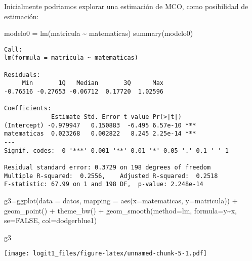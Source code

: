 \documentclass[
]{article}
\newenvironment{Shaded}{\begin{snugshade}}{\end{snugshade}}
\newcommand{\AttributeTok}[1]{\textcolor[rgb]{0.77,0.63,0.00}{#1}}
\newcommand{\ConstantTok}[1]{\textcolor[rgb]{0.00,0.00,0.00}{#1}}
\newcommand{\FunctionTok}[1]{\textcolor[rgb]{0.00,0.00,0.00}{#1}}
\newcommand{\NormalTok}[1]{#1}
\newcommand{\OtherTok}[1]{\textcolor[rgb]{0.56,0.35,0.01}{#1}}
\newcommand{\SpecialCharTok}[1]{\textcolor[rgb]{0.00,0.00,0.00}{#1}}
\newcommand{\StringTok}[1]{\textcolor[rgb]{0.31,0.60,0.02}{#1}}
\begin{document}
Inicialmente podriamos explorar una estimación de MCO, como posibilidad
de estimación:

\begin{Shaded}
\begin{Highlighting}[]
\NormalTok{modelo0 }\OtherTok{=} \FunctionTok{lm}\NormalTok{(matricula }\SpecialCharTok{\textasciitilde{}}\NormalTok{ matematicas)}
\FunctionTok{summary}\NormalTok{(modelo0)}
\end{Highlighting}
\end{Shaded}

\begin{verbatim}
Call:
lm(formula = matricula ~ matematicas)

Residuals:
     Min       1Q   Median       3Q      Max 
-0.76516 -0.27653 -0.06712  0.17720  1.02596 

Coefficients:
             Estimate Std. Error t value Pr(>|t|)    
(Intercept) -0.979947   0.150883  -6.495 6.57e-10 ***
matematicas  0.023268   0.002822   8.245 2.25e-14 ***
---
Signif. codes:  0 '***' 0.001 '**' 0.01 '*' 0.05 '.' 0.1 ' ' 1

Residual standard error: 0.3729 on 198 degrees of freedom
Multiple R-squared:  0.2556,    Adjusted R-squared:  0.2518 
F-statistic: 67.99 on 1 and 198 DF,  p-value: 2.248e-14
\end{verbatim}

\begin{Shaded}
\begin{Highlighting}[]
\NormalTok{g3}\OtherTok{=}\FunctionTok{ggplot}\NormalTok{(}\AttributeTok{data =}\NormalTok{ datos, }\AttributeTok{mapping =} \FunctionTok{aes}\NormalTok{(}\AttributeTok{x=}\NormalTok{matematicas, }\AttributeTok{y=}\NormalTok{matricula)) }\SpecialCharTok{+} 
           \FunctionTok{geom\_point}\NormalTok{() }\SpecialCharTok{+} 
           \FunctionTok{theme\_bw}\NormalTok{() }\SpecialCharTok{+} 
           \FunctionTok{geom\_smooth}\NormalTok{(}\AttributeTok{method=}\StringTok{\textquotesingle{}lm\textquotesingle{}}\NormalTok{, }\AttributeTok{formula=}\NormalTok{y}\SpecialCharTok{\textasciitilde{}}\NormalTok{x, }\AttributeTok{se=}\ConstantTok{FALSE}\NormalTok{, }\AttributeTok{col=}\StringTok{\textquotesingle{}dodgerblue1\textquotesingle{}}\NormalTok{)}

\NormalTok{g3}
\end{Highlighting}
\end{Shaded}

\texttt{[image: logit1\_files/figure-latex/unnamed-chunk-5-1.pdf]}
\end{document}
